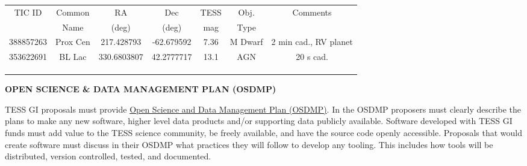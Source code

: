 \documentclass[letterpaper,12pt]{article}
\begin{document}
\begin{center}
\begin{tabular}{ | c | c | c | c | c | c | c | }
\hline
TIC ID          &      Common      &     RA             &      Dec          &      TESS       &       Obj.        &      Comments \\       
                    &      Name           &     (deg)          &      (deg)        &      mag         &       Type       &                         \\     
\hline
\hline
388857263  &  Prox Cen           &  217.428793  &  -62.679592  &  7.36             &    M Dwarf    & 2 min cad., RV planet \\ \hline
353622691  &  BL Lac               &   330.6803807    &   42.2777717    &   13.1  &   AGN            &    20 s cad.                                 \\ \hline
                    &                           &                       &                      &                      &                     &                                     \\ \hline
                    &                           &                       &                      &                      &                     &                                     \\ \hline
                    &                           &                       &                      &                      &                     &                                     \\ \hline
\end{tabular}
\end{center}   

\newpage

\begin{center} 
\bfseries\uppercase{
Open Science \& Data Management Plan (OSDMP)
}
\end{center}


\noindent TESS GI proposals must provide \href{https://science.nasa.gov/researchers/open-science/science-information-policy_faq/}{Open Science and Data Management Plan (OSDMP)}. In the OSDMP proposers must clearly describe the plans to make any new software, higher level data
products and/or supporting data publicly available. Software developed with TESS GI
funds must add value to the TESS science community, be freely available, and have the
source code openly accessible. Proposals that would create software must discuss in their OSDMP
what practices they will follow to develop any tooling. This includes how tools will be
distributed, version controlled, tested, and documented. 
\end{document}
